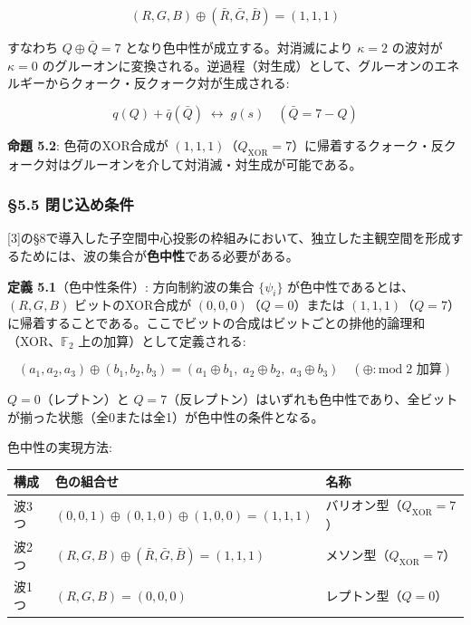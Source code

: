 \documentclass[
  a4paper,11pt]{ltjsarticle}
\newcounter{none}
\theoremstyle{definition}
\theoremstyle{remark}
\begin{document}
\[(R,G,B) \oplus (\bar{R},\bar{G},\bar{B}) = (1,1,1)\]

すなわち \(Q \oplus \bar{Q} = 7\) となり色中性が成立する。対消滅により
\(\kappa = 2\) の波対が \(\kappa = 0\)
のグルーオンに変換される。逆過程（対生成）として、グルーオンのエネルギーからクォーク・反クォーク対が生成される:

\[q(Q) + \bar{q}(\bar{Q}) \;\longleftrightarrow\; g(s) \quad (\bar{Q} = 7 - Q)\]

\textbf{命題 5.2}: 色荷のXOR合成が
\((1,1,1)\)（\(Q_{\mathrm{XOR}} = 7\)）に帰着するクォーク・反クォーク対はグルーオンを介して対消滅・対生成が可能である。

\subsubsection{§5.5
閉じ込め条件}\label{ux9589ux3058ux8fbcux3081ux6761ux4ef6}

{[}3{]}の§8で導入した子空間中心投影の枠組みにおいて、独立した主観空間を形成するためには、波の集合が\textbf{色中性}である必要がある。

\textbf{定義 5.1}（色中性条件）: 方向制約波の集合 \(\{\psi_i\}\)
が色中性であるとは、\((R,G,B)\) ビットのXOR合成が
\((0,0,0)\)（\(Q = 0\)）または
\((1,1,1)\)（\(Q = 7\)）に帰着することである。ここでビットの合成はビットごとの排他的論理和（XOR、\(\mathbb{F}_2\)
上の加算）として定義される:

\[(a_1, a_2, a_3) \oplus (b_1, b_2, b_3) = (a_1 \oplus b_1,\; a_2 \oplus b_2,\; a_3 \oplus b_3) \quad (\oplus: \text{mod}\; 2 \text{ 加算})\]

\(Q = 0\)（レプトン）と
\(Q = 7\)（反レプトン）はいずれも色中性であり、全ビットが揃った状態（全0または全1）が色中性の条件となる。

色中性の実現方法:

{\def\LTcaptype{none} %
\begin{longtable}[]{@{}
  >{\raggedright\arraybackslash}p{}
  >{\raggedright\arraybackslash}p{}
  >{\raggedright\arraybackslash}p{}@{}}
\toprule\noalign{}
\begin{minipage}[b]{\linewidth}\raggedright
構成
\end{minipage} & \begin{minipage}[b]{\linewidth}\raggedright
色の組合せ
\end{minipage} & \begin{minipage}[b]{\linewidth}\raggedright
名称
\end{minipage} \\
\midrule\noalign{}
\endhead
\bottomrule\noalign{}
\endlastfoot
波3つ & \((0,0,1) \oplus (0,1,0) \oplus (1,0,0) = (1,1,1)\) &
バリオン型（\(Q_{\mathrm{XOR}} = 7\)） \\
波2つ & \((R,G,B) \oplus (\bar{R},\bar{G},\bar{B}) = (1,1,1)\) &
メソン型（\(Q_{\mathrm{XOR}} = 7\)） \\
波1つ & \((R,G,B) = (0,0,0)\) & レプトン型（\(Q = 0\)） \\
\end{longtable}
}
\end{document}
